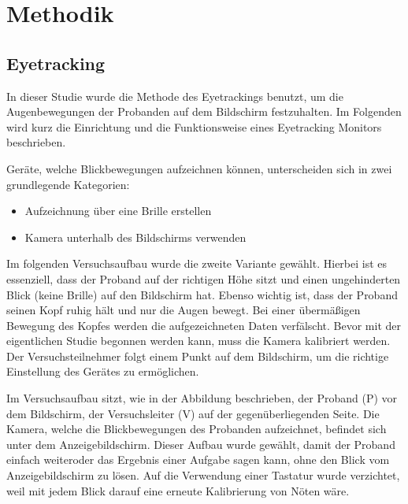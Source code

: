 \chapter{Methodik}

\section{Eyetracking}

In dieser Studie wurde die Methode des Eyetrackings benutzt, um die Augenbewegungen der Probanden auf dem Bildschirm festzuhalten. Im Folgenden wird kurz die Einrichtung und die Funktionsweise eines Eyetracking Monitors beschrieben. 

Geräte, welche Blickbewegungen aufzeichnen können, unterscheiden sich in zwei grundlegende Kategorien:
    \begin{itemize}
        \item Aufzeichnung über eine Brille erstellen
        \item Kamera unterhalb des Bildschirms verwenden
    \end{itemize}


Im folgenden Versuchsaufbau wurde die zweite Variante gewählt. Hierbei ist es essenziell, dass der Proband auf der richtigen Höhe sitzt und einen ungehinderten Blick (keine Brille) auf den Bildschirm hat. Ebenso wichtig ist, dass der Proband seinen Kopf ruhig hält und nur die Augen bewegt. Bei einer übermäßigen Bewegung des Kopfes werden die aufgezeichneten Daten verfälscht. Bevor mit der eigentlichen Studie begonnen werden kann, muss die Kamera kalibriert werden. Der Versuchsteilnehmer folgt einem Punkt auf dem Bildschirm, um die richtige Einstellung des Gerätes zu ermöglichen. 


Im Versuchsaufbau sitzt, wie in der Abbildung beschrieben, der Proband (P) vor dem Bildschirm, der Versuchsleiter (V) auf der gegenüberliegenden Seite.
Die Kamera, welche die Blickbewegungen des Probanden aufzeichnet, befindet sich unter dem Anzeigebildschirm. Dieser Aufbau wurde gewählt, damit der Proband einfach \grqq weiter\grqq oder das Ergebnis einer Aufgabe sagen kann, ohne den Blick vom Anzeigebildschirm zu lösen. Auf die Verwendung einer Tastatur wurde verzichtet, weil mit jedem Blick darauf eine erneute Kalibrierung von Nöten wäre.

